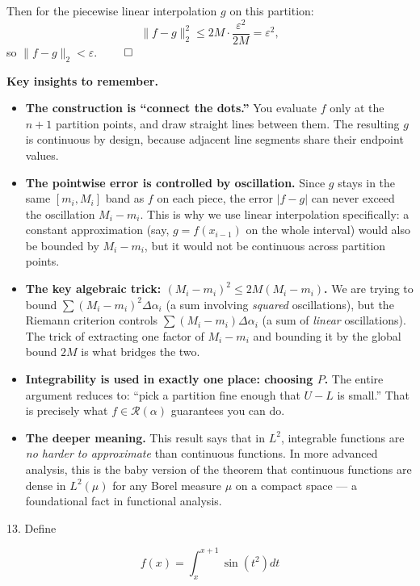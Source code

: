 \documentclass[10pt]{article}
\begin{document}
Then for the piecewise linear interpolation $g$ on this partition:
$$\|f - g\|_2^2 \leq 2M \cdot \frac{\varepsilon^2}{2M} = \varepsilon^2,$$
so $\|f - g\|_2 < \varepsilon$. $\qed$

\medskip
\textbf{Key insights to remember.}

\begin{itemize}
  \item \textbf{The construction is ``connect the dots.''} You evaluate $f$ only at the $n+1$ partition points, and draw straight lines between them.
  The resulting $g$ is continuous by design, because adjacent line segments share their endpoint values.

  \item \textbf{The pointwise error is controlled by oscillation.} Since $g$ stays in the same $[m_i, M_i]$ band as $f$ on each piece, the error $|f - g|$ can never exceed the oscillation $M_i - m_i$.
  This is why we use linear interpolation specifically: a constant approximation (say, $g = f(x_{i-1})$ on the whole interval) would also be bounded by $M_i - m_i$, but it would not be continuous across partition points.

  \item \textbf{The key algebraic trick: $(M_i - m_i)^2 \leq 2M(M_i - m_i)$.}
  We are trying to bound $\sum (M_i - m_i)^2 \Delta\alpha_i$ (a sum involving \emph{squared} oscillations), but the Riemann criterion controls $\sum (M_i - m_i) \Delta\alpha_i$ (a sum of \emph{linear} oscillations).
  The trick of extracting one factor of $M_i - m_i$ and bounding it by the global bound $2M$ is what bridges the two.

  \item \textbf{Integrability is used in exactly one place: choosing $P$.}
  The entire argument reduces to: ``pick a partition fine enough that $U - L$ is small.'' That is precisely what $f \in \mathscr{R}(\alpha)$ guarantees you can do.

  \item \textbf{The deeper meaning.} This result says that in $L^2$, integrable functions are \emph{no harder to approximate} than continuous functions.
  In more advanced analysis, this is the baby version of the theorem that continuous functions are dense in $L^2(\mu)$ for any Borel measure $\mu$ on a compact space --- a foundational fact in functional analysis.
\end{itemize}
\color{black}

13. Define

$$
f(x)=\int_{x}^{x+1} \sin \left(t^{2}\right) d t
$$
\end{document}
